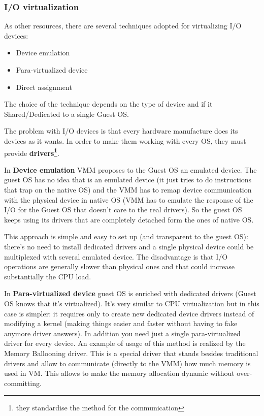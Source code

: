 \subsubsection{I/O virtualization}
As other resources, there are several techniques adopted for virtualizing I/O devices:
\begin{itemize}
    \item Device emulation
    \item Para-virtualized device
    \item Direct assignment
\end{itemize}
The choice of the technique depends on the type of device and if it Shared/Dedicated to a single Guest OS.

The problem with I/O devices is that every hardware manufacture does its devices as it wants. In order to make them working with every OS, they must provide \textbf{drivers\footnote{they standardise the method for the communication}}.

In \textbf{Device emulation} VMM proposes to the Guest OS an emulated device. The guest OS has no idea that is an emulated device (it just tries to do instructions that trap on the native OS) and the VMM has to remap device communication with the physical device in native OS (VMM has to emulate the response of the I/O for the Guest OS that doesn't care to the real drivers).
So the guest OS keeps using its drivers that are completely detached form the ones of native OS.

This approach is simple and easy to set up (and transparent to the guest OS): there's no need to install dedicated drivers and a single physical device could be multiplexed with several emulated device.
The disadvantage is that I/O operations are generally slower than physical ones and that could increase substantially the CPU load.

In \textbf{Para-virtualized device} guest OS is enriched with dedicated drivers (Guest OS knows that it's virtualized). It's very similar to CPU virtualization but in this case is simpler: it requires only to create new dedicated device drivers instead of modifying a kernel (making things easier and faster without having to fake anymore driver answers). In addition you need just a single para-virtualized driver for every device.
An example of usage of this method is realized by the Memory Ballooning driver. This is a special driver that stands besides traditional drivers and allow to communicate (directly to the VMM) how much memory is used in VM. This allows to make the memory allocation dynamic without over-committing.

